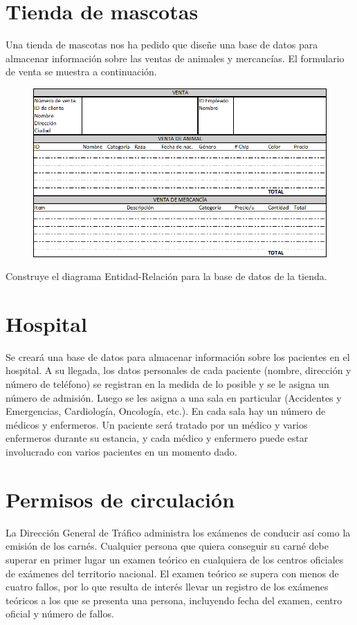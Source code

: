 \documentclass{db-practice}
\begin{document}
\section{Tienda de mascotas}
Una tienda de mascotas nos ha pedido que diseñe una base de datos para almacenar información sobre las ventas de animales y mercancías. El formulario de venta se muestra a continuación.
\begin{figure}[h]
    \centering
    \includegraphics[width=\textwidth]{figs/mascotas}
\end{figure}
Construye el diagrama Entidad-Relación para la base de datos de la tienda.

\section{Hospital}
Se creará una base de datos para almacenar información sobre los pacientes en el hospital. A su llegada, los datos personales de cada paciente (nombre, dirección y número de teléfono) se registran en la medida de lo posible y se le asigna un número de admisión. Luego se les asigna a una sala en particular (Accidentes y Emergencias, Cardiología, Oncología, etc.). En cada sala hay un número de médicos y enfermeros. Un paciente será tratado por un médico y varios enfermeros durante su estancia, y cada médico y enfermero puede estar involucrado con varios pacientes en un momento dado.

\section{Permisos de circulación}
La Dirección General de Tráfico administra los exámenes de conducir así como la emisión de los carnés. Cualquier persona que quiera conseguir su carné debe superar en primer lugar un examen teórico en cualquiera de los centros oficiales de exámenes del territorio nacional. El examen teórico se supera con menos de cuatro fallos, por lo que resulta de interés llevar un registro de los exámenes teóricos a los que se presenta una persona, incluyendo fecha del examen, centro oficial y número de fallos.
\end{document}
